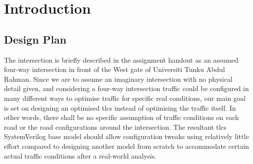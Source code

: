 \section{Introduction}
\lipsum[2]
\subsection{Design Plan}
The intersection is briefly described in the assignment handout as an assumed four-way intersection in front of the West gate of Universiti Tunku Abdul Rahman. Since we are to assume an imaginary intersection with no physical detail given, and considering a four-way intersection traffic could be configured in many different ways to optimise traffic for specific real conditions, our main goal is set on designing an optimised \ac{tlcs} instead of optimising the traffic itself. In other words, there shall be no specific assumption of traffic conditions on each road or the road configurations around the intersection. The resultant \acs{tlcs} SystemVerilog base model should allow configuration tweaks using relatively little effort compared to designing another model from scratch to accommodate certain actual traffic conditions after a real-world analysis.

